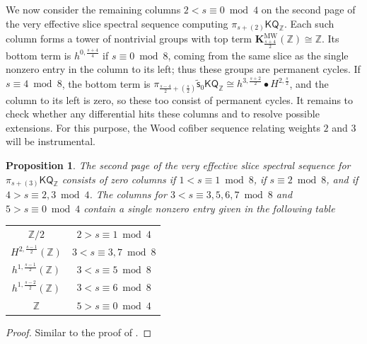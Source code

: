 \documentclass[11pt,hyp,english]{article}
\newcommand{\Z}{\mathbb{Z}}
\newcommand{\KQ}{\mathsf{KQ}}
\newcommand{\vs}{\tilde{\mathsf{s}}}
\newcommand{\KMW}{\mathbf{K}^\mathrm{MW}}
\newtheorem{proposition}[theorem]{Proposition}
\theoremstyle{definition}
\begin{document}
We now consider the remaining columns $2 < s \equiv 0 \bmod 4$ on the second page of the very effective slice spectral sequence computing $\pi_{s+(2)} \KQ_\Z$. Each such column forms a tower of nontrivial groups with top term 
$\KMW_{\frac{s+4}{2}}(\Z) \cong \Z$.
Its bottom term is $h^{0,\frac{s+4}{4}}$ 
if $s \equiv 0 \bmod 8$, 
coming from the same slice as the single nonzero entry in the column to its left; 
thus these groups are permanent cycles.  
If $s \equiv 4 \bmod 8$, the bottom term is 
$\pi_{\frac{s-4}{2}+(\frac{s}{2})}\vs_0 \KQ_\Z \cong h^{3,\frac{s+2}{2}} \bullet H^{2,\frac{s}{2}}$, 
and the column to its left is zero, so these too consist of permanent cycles.  
It remains to check whether any differential hits these columns and to resolve possible extensions. For this purpose, the Wood cofiber sequence relating weights $2$ and $3$ will be instrumental.


\begin{proposition}\label{prop:2ndpageweight3KQ}
The second page of the very effective slice spectral sequence for $\pi_{s+(3)}\KQ_\Z$ consists of zero columns if $1<s\equiv 1\bmod 8$, if $s\equiv 2\bmod 8$, and if $4>s\equiv 2,3 \bmod 4$.
The columns for $3<s\equiv 3,5,6,7 \bmod 8$ and $5>s\equiv 0\bmod 4$ contain a single nonzero entry given in the following table
\begin{center}
\begin{tabular}{|c|c|}
\hline
$\Z/2$ & $2>s\equiv 1\bmod 4$ \\
$H^{2,\frac{s-1}{2}}(\Z)$ & $3<s \equiv 3,7 \bmod 8$ \\
$h^{1,\frac{s-1}{2}}(\Z)$ & $3<s\equiv 5 \bmod 8$ \\
$h^{1,\frac{s-2}{2}}(\Z)$ &  $3<s\equiv 6\bmod 8$ \\
$\Z$ & $5>s\equiv 0 \bmod 4$ \\
\hline
\end{tabular}
\end{center}
\end{proposition}

\begin{proof}
    Similar to the proof of .
\end{proof}
\end{document}
